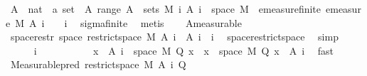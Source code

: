 \begin{isabellebody}
\ A\ {\isacharcolon}{\kern0pt}{\isacharcolon}{\kern0pt}\ {\isachardoublequoteopen}nat\ {\isasymRightarrow}\ {\isacharprime}{\kern0pt}a\ set{\isachardoublequoteclose}\ \ A{\isacharcolon}{\kern0pt}\ {\isachardoublequoteopen}range\ A\ {\isasymsubseteq}\ sets\ M{\isachardoublequoteclose}\ {\isachardoublequoteopen}{\isacharparenleft}{\kern0pt}{\isasymUnion}i{\isachardot}{\kern0pt}\ A\ i{\isacharparenright}{\kern0pt}\ {\isacharequal}{\kern0pt}\ space\ M{\isachardoublequoteclose}\ \ emeasure{\isacharunderscore}{\kern0pt}finite{\isacharcolon}{\kern0pt}\ {\isachardoublequoteopen}emeasure\ M\ {\isacharparenleft}{\kern0pt}A\ i{\isacharparenright}{\kern0pt}\ {\isasymnoteq}\ {\isasyminfinity}{\isachardoublequoteclose}\ \ i\ \isamarkupfalse%
\ sigma{\isacharunderscore}{\kern0pt}finite\ \isamarkupfalse%
\ metis\isanewline
\ \ \isamarkupfalse%
\ A{\isacharparenleft}{\kern0pt}{}{\isacharparenright}{\kern0pt}{\isacharbrackleft}{\kern0pt}measurable{\isacharbrackright}{\kern0pt}\isanewline
\ \ \isamarkupfalse%
\ space{\isacharunderscore}{\kern0pt}restr{\isacharcolon}{\kern0pt}\ {\isachardoublequoteopen}space\ {\isacharparenleft}{\kern0pt}restrict{\isacharunderscore}{\kern0pt}space\ M\ {\isacharparenleft}{\kern0pt}A\ i{\isacharparenright}{\kern0pt}{\isacharparenright}{\kern0pt}\ {\isacharequal}{\kern0pt}\ A\ i{\isachardoublequoteclose}\ \ i\ \isamarkupfalse%
\ space{\isacharunderscore}{\kern0pt}restrict{\isacharunderscore}{\kern0pt}space\ \isamarkupfalse%
\ simp\isanewline
\ \ \isacommand{{\isacharbraceleft}{\kern0pt}}\isamarkupfalse%
\isanewline
\ \ \ \ \isamarkupfalse%
\ i\ \ \ \ \isanewline
\ \ \ \ \isamarkupfalse%
\ {\isacharasterisk}{\kern0pt}{\isacharcolon}{\kern0pt}\ {\isachardoublequoteopen}{\isacharbraceleft}{\kern0pt}x\ {\isasymin}\ A\ i\ {\isasyminter}\ space\ M{\isachardot}{\kern0pt}\ Q\ x{\isacharbraceright}{\kern0pt}\ {\isacharequal}{\kern0pt}\ {\isacharbraceleft}{\kern0pt}x\ {\isasymin}\ space\ M{\isachardot}{\kern0pt}\ Q\ x{\isacharbraceright}{\kern0pt}\ {\isasyminter}\ {\isacharparenleft}{\kern0pt}A\ i{\isacharparenright}{\kern0pt}{\isachardoublequoteclose}\ \isamarkupfalse%
\ fast\isanewline
\ \ \ \ \isamarkupfalse%
\ {\isachardoublequoteopen}Measurable{\isachardot}{\kern0pt}pred\ {\isacharparenleft}{\kern0pt}restrict{\isacharunderscore}{\kern0pt}space\ M\ {\isacharparenleft}{\kern0pt}A\ i{\isacharparenright}{\kern0pt}{\isacharparenright}{\kern0pt}\ Q{\isachardoublequoteclose}\ \isamarkupfalse%

\end{isabellebody}
